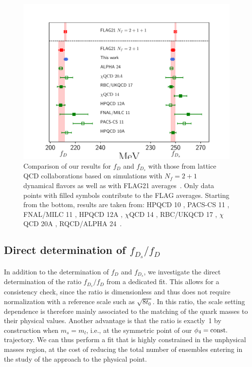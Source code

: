 \begin{figure}
	\centering
	\includegraphics[scale=0.70]{./cap6/figs/fds/fds_comparison.pdf}
	\caption{Comparison of our results for $f_D$ and $f_{D_s}$  with those from lattice QCD collaborations based on simulations with $N_f=2+1$ dynamical flavors as well as with FLAG21 averages~\cite{FlavourLatticeAveragingGroupFLAG:2021npn}.
          Only data points with filled symbols contribute to  the FLAG averages. Starting from the bottom, results are taken from: HPQCD 10 \cite{Davies:2010ip}, PACS-CS 11 \cite{PACS-CS:2011ngu}, FNAL/MILC 11 \cite{FermilabLattice:2011njy}, HPQCD 12A \cite{Na:2012iu}, $\chi$QCD 14 \cite{Yang:2014sea}, RBC/UKQCD 17 \cite{Boyle:2017jwu},  $\chi$QCD 20A \cite{Chen:2020qma}, RQCD/ALPHA 24~\citep{Kuberski:2024pms}.
          }
	\label{fig:fds_comparison}
\end{figure}


\subsection{Direct determination of $f_{D_s}/f_D$}

In addition to the determination of $f_D$ and $f_{D_s}$, we investigate the direct determination
of the ratio $f_{D_s}/f_D$ from a dedicated fit. This allows for a consistency check, since
the ratio is dimensionless and thus does not require normalization with a reference scale
such as $\sqrt{8t_0}$. In this ratio, the scale setting dependence is therefore mainly associated to the matching of the quark masses to their physical values. Another advantage
is that the ratio is exactly~1 by construction when $m_s=m_l$, i.e., at the symmetric
point of our $\phi_4={\rm const.}$ trajectory. We can thus perform a fit that is highly constrained in the unphysical masses
region, at the cost of reducing the total number of ensembles entering in the study of the approach to the physical point.

